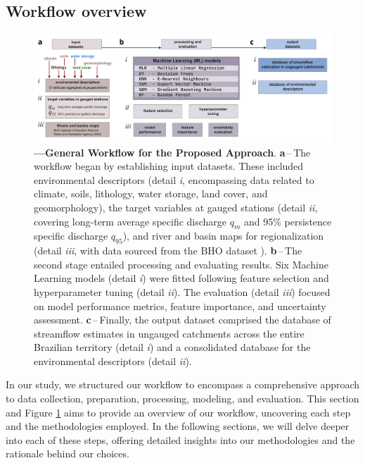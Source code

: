 \documentclass[12pt]{article}
\begin{document}
\subsection{Workflow overview}

\begin{figure}[t!] %
	\centering                                       
	\includegraphics[width=0.98\linewidth]{figs/methods.jpg}    
	\caption[General methodology framework]
	{\textbf{---\;General Workflow for the Proposed Approach}. 
		\textbf{a}\,--\,The workflow began by establishing input datasets. These included environmental descriptors (detail \textrm{\textit{i}}, encompassing data related to climate, soils, lithology, water storage, land cover, and geomorphology), the target variables at gauged stations (detail \textrm{\textit{ii}}, covering long-term average specific discharge $q_m$ and 95\% persistence specific discharge $q_{95}$), and river and basin maps for regionalization (detail \textrm{\textit{iii}}, with data sourced from the BHO dataset \cite{ana2017}).
		\textbf{b}\,--\,The second stage entailed processing and evaluating results. Six Machine Learning models (detail \textrm{\textit{i}}) were fitted following feature selection and hyperparameter tuning (detail \textrm{\textit{ii}}). The evaluation (detail \textrm{\textit{iii}}) focused on model performance metrics, feature importance, and uncertainty assessment.	
        \textbf{c}\,--\,Finally, the output dataset comprised the database of streamflow estimates in ungauged catchments across the entire Brazilian territory (detail \textrm{\textit{i}}) and a consolidated database for the environmental descriptors (detail \textrm{\textit{ii}}).	
	}
	\label{fig:methods}  %
\end{figure}

\par In our study, we structured our workflow to encompass a comprehensive approach to data collection, preparation, processing, modeling, and evaluation. This section and Figure \ref{fig:methods} aims to provide an overview of our workflow, uncovering each step and the methodologies employed. In the following sections, we will delve deeper into each of these steps, offering detailed insights into our methodologies and the rationale behind our choices.
\end{document}
